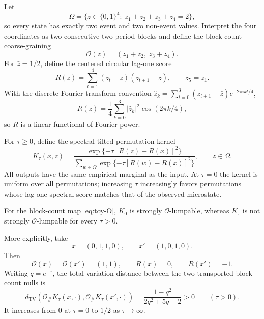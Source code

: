 Let
\[
\Omega=\{z\in\{0,1\}^4:\;z_1+z_2+z_3+z_4=2\},
\]
so every state has exactly two event and two non-event values.  Interpret the
four coordinates as two consecutive two-period blocks and define the block-count
coarse-graining
\begin{equation}
\mathcal O(z)=(z_1+z_2,\;z_3+z_4).
\label{eq:toy-O}
\end{equation}
For $\bar z=1/2$, define the centered circular lag-one score
\begin{equation}
R(z)=\sum_{t=1}^{4}(z_t-\bar z)(z_{t+1}-\bar z),
\qquad z_5=z_1.
\label{eq:toy-R}
\end{equation}
With the discrete Fourier transform convention
$\widehat z_k=\sum_{t=0}^{3}(z_{t+1}-\bar z)e^{-2\pi i kt/4}$,
\[
R(z)=\frac{1}{4}\sum_{k=0}^{3}|\widehat z_k|^2
\cos(2\pi k/4),
\]
so $R$ is a linear functional of Fourier power.

For $\tau\ge0$, define the spectral-tilted permutation kernel
\begin{equation}
K_\tau(x,z)
=
\frac{\exp\{-\tau[R(z)-R(x)]^2\}}
{\sum_{w\in\Omega}\exp\{-\tau[R(w)-R(x)]^2\}},
\qquad z\in\Omega.
\label{eq:toy-kernel}
\end{equation}
All outputs have the same empirical marginal as the input.  At $\tau=0$ the
kernel is uniform over all permutations; increasing $\tau$ increasingly favors
permutations whose lag-one spectral score matches that of the observed
microstate.

\begin{proposition}
\label{prop:toy-counterexample}
For the block-count map \eqref{eq:toy-O}, $K_0$ is strongly
$\mathcal O$-lumpable, whereas $K_\tau$ is not strongly
$\mathcal O$-lumpable for every $\tau>0$.

More explicitly, take
\[
x=(0,1,1,0),
\qquad
x'=(1,0,1,0).
\]
Then
\[
\mathcal O(x)=\mathcal O(x')=(1,1),
\qquad
R(x)=0,
\qquad
R(x')=-1.
\]
Writing $q=e^{-\tau}$, the total-variation distance between the two transported
block-count nulls is
\begin{equation}
 d_{\mathrm{TV}}
 \left(
 \mathcal O_\#K_\tau(x,\cdot),
 \mathcal O_\#K_\tau(x',\cdot)
 \right)
 =
 \frac{1-q^2}{2q^2+5q+2}
 >0
 \qquad (\tau>0).
\label{eq:toy-TV}
\end{equation}
It increases from $0$ at $\tau=0$ to $1/2$ as $\tau\to\infty$.
\end{proposition}

